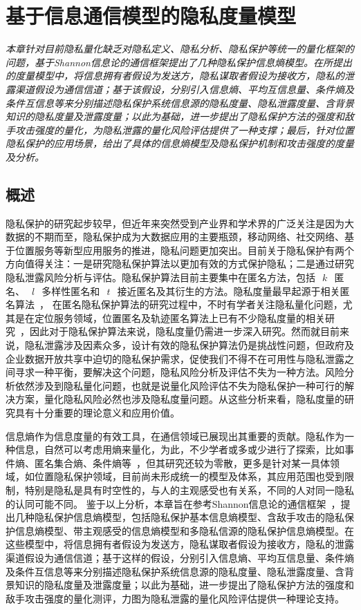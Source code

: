 \chapter{基于信息通信模型的隐私度量模型}
\label{chap:entropy-metric-model}

\textit{ }

\textit{本章针对目前隐私量化缺乏对隐私定义、隐私分析、隐私保护等统一的量化框架的问题，基于Shannon信息论的通信框架提出了几种隐私保护信息熵模型。在所提出的度量模型中，将信息拥有者假设为发送方，隐私谋取者假设为接收方，隐私的泄露渠道假设为通信信道；基于该假设，分别引入信息熵、平均互信息量、条件熵及条件互信息等来分别描述隐私保护系统信息源的隐私度量、隐私泄露度量、含背景知识的隐私度量及泄露度量；以此为基础，进一步提出了隐私保护方法的强度和敌手攻击强度的量化，为隐私泄露的量化风险评估提供了一种支撑；最后，针对位置隐私保护的应用场景，给出了具体的信息熵模型及隐私保护机制和攻击强度的度量及分析。}

\section{概述}

隐私保护的研究起步较早，但近年来突然受到产业界和学术界的广泛关注是因为大数据的不期而至，隐私保护成为大数据应用的主要瓶颈，移动网络、社交网络、基于位置服务等新型应用服务的推进，隐私问题更加突出。目前关于隐私保护有两个方向值得关注：一是研究隐私保护算法以更加有效的方式保护隐私；二是通过研究隐私泄露风险分析与评估。隐私保护算法目前主要集中在匿名方法，包括~$~k~$~匿名、~$~l~$~多样性匿名和~$~t~$~接近匿名及其衍生的方法。隐私度量最早起源于相关匿名算法~\cite{sweeney2002k}， 在匿名隐私保护算法的研究过程中，不时有学者关注隐私量化问题，尤其是在定位服务领域，位置匿名及轨迹匿名算法上已有不少隐私度量的相关研究~\cite{shokri2011quantifying,olteanu2017quantifying}，因此对于隐私保护算法来说，隐私度量仍需进一步深入研究。然而就目前来说，隐私泄露涉及因素众多，设计有效的隐私保护算法仍是挑战性问题，但政府及企业数据开放共享中迫切的隐私保护需求，促使我们不得不在可用性与隐私泄露之间寻求一种平衡，要解决这个问题，隐私风险分析及评估不失为一种方法。风险分析依然涉及到隐私量化问题，也就是说量化风险评估不失为隐私保护一种可行的解决方案，量化隐私风险必然也涉及隐私度量问题。从这些分析来看，隐私度量的研究具有十分重要的理论意义和应用价值。

信息熵作为信息度量的有效工具，在通信领域已展现出其重要的贡献。隐私作为一种信息，自然可以考虑用熵来量化，为此，不少学者或多或少进行了探索，比如事件熵、匿名集合熵、条件熵等~\cite{serjantov2002towards,diaz2002towards,wagner2018technical}，但其研究还较为零散，更多是针对某一具体领域，如位置隐私保护领域，目前尚未形成统一的模型及体系，其应用范围也受到限制，特别是隐私是具有时空性的，与人的主观感受也有关系，不同的人对同一隐私的认同可能不同。 鉴于以上分析，本章旨在参考Shannon信息论的通信框架~\cite{stone2018information}，提出几种隐私保护信息熵模型，包括隐私保护基本信息熵模型、含敌手攻击的隐私保护信息熵模型、带主观感受的信息熵模型和多隐私信源的隐私保护信息熵模型。在这些模型中，将信息拥有者假设为发送方，隐私谋取者假设为接收方，隐私的泄露渠道假设为通信信道；基于这样的假设，分别引入信息熵、平均互信息量、条件熵及条件互信息等来分别描述隐私保护系统信息源的隐私度量、隐私泄露度量、含背景知识的隐私度量及泄露度量；以此为基础，进一步提出了隐私保护方法的强度和敌手攻击强度的量化测评，力图为隐私泄露的量化风险评估提供一种理论支持。



